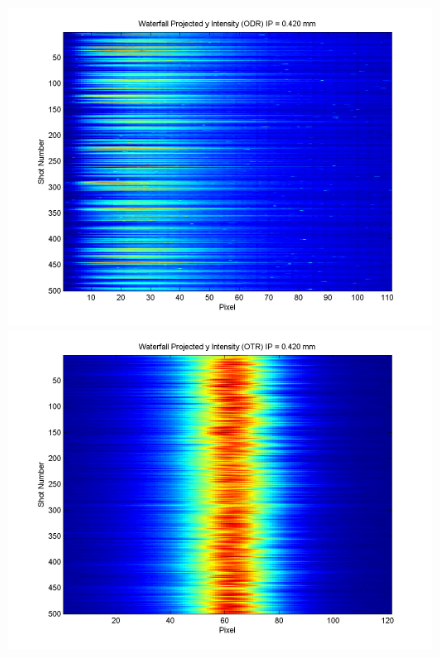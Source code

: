 \documentclass[12pt]{article}
\begin{document}
\begin{figure}
\begin{center}
\includegraphics[scale=0.5]{Figures/ProjY_wfall_ODR_420.PNG}
\includegraphics[scale=0.5]{Figures/ProjY_wfall_OTR_420.PNG}
\caption{}
\end{center}
\end{figure}
\end{document}
